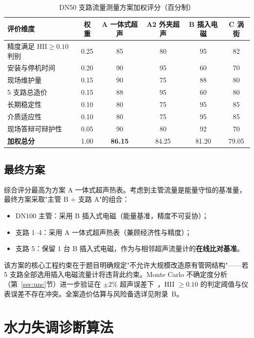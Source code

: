 \documentclass[11pt,a4paper]{ctexart}
\begin{document}
\begin{table}[H]
\centering
\caption{DN50 支路流量测量方案加权评分（百分制）}
\label{tab:comparison}
\small
\begin{tabular}{lccccc}
\toprule
评价维度 & 权重 & A 一体式超声 & A2 外夹超声 & B 插入电磁 & C 涡街 \\
\midrule
精度满足 HII$\geq 0.10$ 判别 & 0.25 & 85 & 80 & 95 & 82 \\
安装与停机时间 & 0.20 & 90 & 95 & 60 & 70 \\
现场维护量 & 0.15 & 90 & 75 & 88 & 80 \\
5 支路总造价 & 0.15 & 88 & 95 & 60 & 80 \\
长期稳定性 & 0.10 & 80 & 75 & 95 & 85 \\
介质适应性 & 0.10 & 80 & 75 & 95 & 85 \\
现场答辩可辩护性 & 0.05 & 90 & 80 & 92 & 70 \\
\midrule
\textbf{加权总分} & 1.00 & \textbf{86.15} & 84.25 & 81.20 & 79.05 \\
\bottomrule
\end{tabular}
\end{table}

\subsection{最终方案}
综合评分最高为方案 A 一体式超声热表。考虑到主管流量是能量守恒的基准量，最终方案采取"主管 B + 支路 A"的组合：
\begin{itemize}[leftmargin=*,itemsep=1pt]
    \item DN100 主管：采用 B 插入式电磁（能量基准，精度不可妥协）；
    \item 支路 1--4：采用 A 一体式超声热表（兼顾经济性与精度）；
    \item 支路 5：保留 1 台 B 插入式电磁，作为与相邻超声流量计的\textbf{在线比对基准}。
\end{itemize}

该方案的核心工程约束在于题目明确规定"不允许大规模改造原有管网结构"——若 5 支路全部选用插入电磁流量计将违背此约束。Monte Carlo 不确定度分析（第~\ref{sec:unc}节）进一步验证在 $\pm 2\%$ 超声误差下~\cite{en1434}，HII $\geq 0.10$ 的判定阈值与仪表误差不存在冲突。全案造价估算与风险备选详见附录~B。

\section{水力失调诊断算法}\label{sec:diag}
\end{document}
